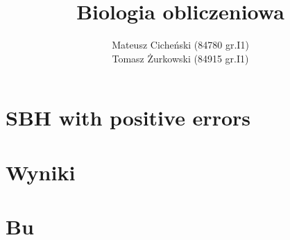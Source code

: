 \documentclass[a4paper]{article}
\title{Biologia obliczeniowa}
\author{Mateusz Cicheński (84780 gr.I1) \\ Tomasz Żurkowski (84915 gr.I1)}
\begin{document}
\maketitle
\tableofcontents

\newpage


\section{SBH with positive errors}

\section{Wyniki}

\section{Bu}
\end{document}
